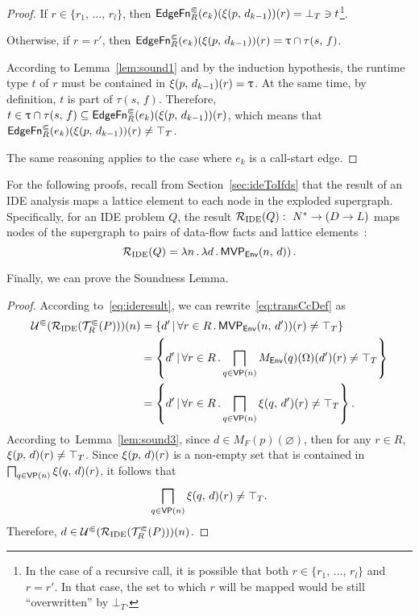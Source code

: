 \begin{proof}
    If $r\in\{r_1,\,\dots,\,r_l\}$, then $\textsf{EdgeFn}^\Subset_{R}(e_k)(\xi(p,\,d_{k-1}))(r)=\bot_T\ni t$\footnote{In the case of a recursive call, it is possible that both $r\in\{r_1,\,\dots,\,r_l\}$ and $r=r'$.
    In that case, the set to which $r$ will be mapped would be still ``overwritten'' by $\bot_T$.}.
    
    Otherwise, if $r=r'$, then $\textsf{EdgeFn}^\Subset_{R}(e_k)(\xi(p,\,d_{k-1}))(r)=\uptau\cap\tau(s,\,f)$.

    According to Lemma~\ref{lem:sound1} and by the induction hypothesis, the runtime type $t$ of $r$ must be contained in $\xi(p,\,d_{k-1})(r)=\uptau$. At the same time, by definition, $t$ is part of $\tau(s,\,f)$. Therefore, $t\in\uptau\cap\tau(s,\,f)\subseteq\textsf{EdgeFn}^\Subset_{R}(e_k)(\xi(p,\,d_{k-1}))(r)$, which means that $\textsf{EdgeFn}^\Subset_{R}(e_k)(\xi(p,\,d_{k-1}))(r)\ne\top_T$.
    
    The same reasoning applies to the case where $e_k$ is a call-start edge.
\end{proof}

For the following proofs, recall from Section~\ref{sec:ideToIfds} that the result of an IDE analysis maps a lattice element to each node in the exploded supergraph. Specifically, for an IDE problem $Q$, the result $\mathcal R_{\text{IDE}}(Q):\ N^*\to(D\to L)$ maps nodes of the supergraph to pairs of data-flow facts and lattice elements~\cite{sagiv1996precise}:
\begin{equation}\label{eq:ideresult}
  \mathcal R_{\text{IDE}}(Q)=\lambda n\,.\,\lambda d\,.\,\textsf{MVP}_{\textsf{Env}}(n,\,d))\,.
\end{equation}

Finally, we can prove the Soundness Lemma.

\sound*
\begin{proof}
According to~\eqref{eq:ideresult}, we can rewrite~\eqref{eq:transCcDef} as
\begin{align*}\label{eq:transCcResultCc}
  \mathcal U^\Subset(\mathcal R_{\text{IDE}}(\mathcal T^\Subset_R(P)))(n)
  &=\{d'\,|\,\forall r\in R\,.\,\textsf{MVP}_{\textsf{Env}}(n,\,d'))(r)\ne\top_T\}\\
  &=\left\{d'\,|\,\forall r\in R\,.\bigsqcap_{q\in\textsf{VP}(n)}M_\textsf{Env}(q)(\Omega)(d')(r)\ne\top_T\right\}\\
  &=\left\{d'\,|\,\forall r\in R\,.\bigsqcap_{q\in\textsf{VP}(n)}\xi(q,\,d')(r)\ne\top_T\right\}.
\end{align*}
  According to~Lemma~\ref{lem:sound3}, since $d\in M_F(p)(\varnothing)$, then for any $r\in R$, $\xi(p,\,d)(r)\ne\top_T$. 
  Since $\xi(p,\,d)(r)$ is a non-empty set that is contained in $\bigsqcap_{q\in\textsf{VP}(n)}\xi(q,\,d)(r)$, it follows that $$\bigsqcap_{q\in\textsf{VP}(n)}\xi(q,\,d)(r)\ne\top_T.$$ Therefore, $d\in \mathcal U^\Subset(\mathcal R_{\text{IDE}}(\mathcal T^\Subset_R(P)))(n)$.
\end{proof}

